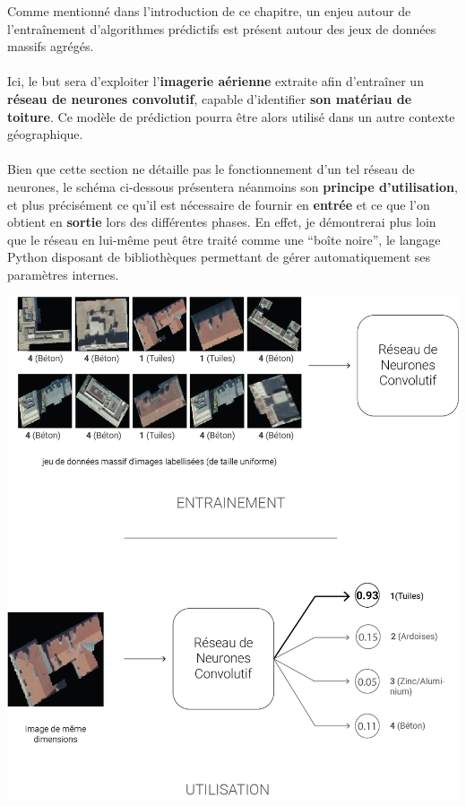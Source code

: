 \documentclass[
  11pt,
  french,
]{article}
\newcounter{customfigs}[section]
\newenvironment{customfigs}[1][] {
    \stepcounter{customfigs}
    Fig \arabic{section}. \arabic{customfigs} : }
\newcommand{\masked}{\vspace*{-\baselineskip}}
\begin{document}
Comme mentionné dans l'introduction de ce chapitre, un enjeu autour de
l'entraînement d'algorithmes prédictifs est présent autour des jeux de
données massifs agrégés.\\
~\\
Ici, le but sera d'exploiter l'\textbf{imagerie aérienne} extraite afin
d'entraîner un \textbf{réseau de neurones convolutif}, capable
d'identifier \textbf{son matériau de toiture}. Ce modèle de prédiction
pourra être alors utilisé dans un autre contexte géographique.\\
~\\
Bien que cette section ne détaille pas le fonctionnement d'un tel réseau
de neurones, le schéma ci-dessous présentera néanmoins son
\textbf{principe d'utilisation}, et plus précisément ce qu'il est
nécessaire de fournir en \textbf{entrée} et ce que l'on obtient en
\textbf{sortie} lors des différentes phases. En effet, je démontrerai
plus loin que le réseau en lui-même peut être traité comme une ``boîte
noire'', le langage Python disposant de bibliothèques permettant de
gérer automatiquement ses paramètres internes.

\begin{tcolorbox}[title=\begin{customfigs} Représentation simplifiée de l'utilisation d'un réseau de neurones convolutif \end{customfigs}]

\begin{center}\includegraphics[height=0.9\textheight]{__imgs/cnn_schema} \end{center}

\end{tcolorbox}
\end{document}
